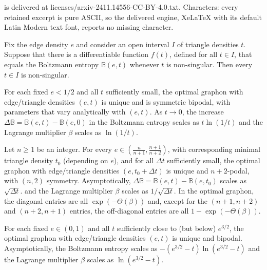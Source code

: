 \documentclass[10pt,a4paper]{amsart}
\newcommand{\B}{\mathbb{B}}
\begin{document}
is delivered at licenses/arxiv-2411.14556-CC-BY-4.0.txt. Characters: every retained excerpt is pure ASCII, so the delivered engine, XeLaTeX with its default Latin Modern text font, reports no missing character.
\begin{theorem} \label{thm:no-singular} 
Fix the edge density $e$ and consider an open interval $I$ of triangle densities $t$. Suppose that there is a
differentiable function $f(t)$, defined for all $t \in I$, that equals the Boltzmann entropy $\B(e,t)$ 
whenever $t$ is non-singular. Then every $t \in I$ is non-singular. 
\end{theorem} 

\begin{theorem} \label{thm:flat2}
For each fixed $e<1/2$ and all $t$ sufficiently small, the 
optimal graphon with edge/triangle densities $(e,t)$ is unique and is symmetric bipodal, with parameters that vary analytically with $(e,t)$. As $t \to 0$,
the increase $\Delta \B = \B(e,t)-\B(e,0)$ in the 
Boltzmann entropy scales as $t \ln(1/t)$ and the Lagrange multiplier 
$\beta$ scales as $\ln(1/t)$. 
\end{theorem} 

\begin{theorem} \label{thm:scallop2}
Let $n \ge 1$ be an integer. For every $e \in \left ( \frac{n}{n+1}, \frac{n+1}{n+2}\right )$, with 
corresponding minimal triangle density $t_0$ (depending on $e$), 
and for all
$\Delta t$ sufficiently small, the optimal graphon with edge/triangle densities $(e, t_0 + \Delta t)$
is unique and $n+2$-podal, with $(n,2)$ symmetry. Asymptotically, 
$\Delta \B = \B(e,t) - 
\B(e,t_0)$ scales as $\sqrt{\Delta t}$.
and the Lagrange multiplier 
$\beta$ scales as $1/\sqrt{\Delta t}$.
In the optimal graphon, the diagonal entries are all $\exp(-\Theta(\beta))$ and, except for the 
$(n+1, n+2)$ and $(n+2,n+1)$ entries, the off-diagonal entries are all $1 - \exp(-\Theta(\beta))$.
\end{theorem}

\begin{theorem}\label{thm:top2}
For each fixed $e \in (0,1)$ and all $t$ sufficiently close to (but below) $e^{3/2}$, the 
optimal graphon with edge/triangle densities $(e,t)$ is unique and bipodal. Asymptotically, the Boltzmann entropy 
scales as $-(e^{3/2}-t)\ln(e^{3/2}-t)$
and the Lagrange multiplier $\beta$ scales as $\ln(e^{3/2}-t)$. 
\end{theorem}
\end{document}
